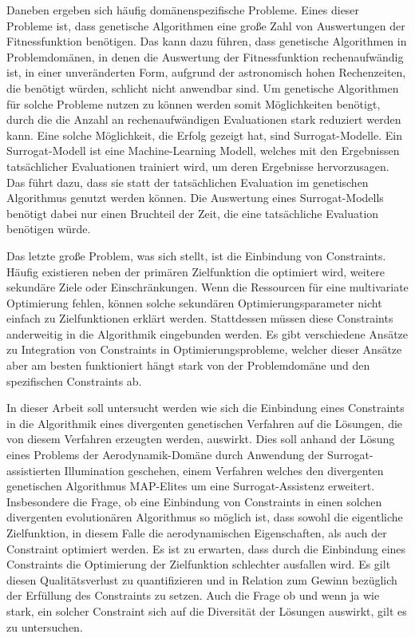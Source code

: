 Daneben ergeben sich häufig domänenspezifische Probleme.
Eines dieser Probleme ist, dass genetische Algorithmen eine große Zahl von Auswertungen der Fitnessfunktion benötigen.
Das kann dazu führen, dass genetische Algorithmen in Problemdomänen, in denen die Auswertung der Fitnessfunktion rechenaufwändig ist, in einer unveränderten Form,
aufgrund der astronomisch hohen Rechenzeiten, die benötigt würden, schlicht nicht anwendbar sind.
Um genetische Algorithmen für solche Probleme nutzen zu können werden somit Möglichkeiten benötigt, durch die die Anzahl an rechenaufwändigen Evaluationen stark reduziert werden kann.
Eine solche Möglichkeit, die Erfolg gezeigt hat, sind Surrogat-Modelle.
Ein Surrogat-Modell ist eine Machine-Learning Modell, welches mit den Ergebnissen tatsächlicher Evaluationen trainiert wird, um deren Ergebnisse hervorzusagen.
Das führt dazu, dass sie statt der tatsächlichen Evaluation im genetischen Algorithmus genutzt werden können.
Die Auswertung eines Surrogat-Modells benötigt dabei nur einen Bruchteil der Zeit, die eine tatsächliche Evaluation benötigen würde.

Das letzte große Problem, was sich stellt, ist die Einbindung von Constraints.
Häufig existieren neben der primären Zielfunktion die optimiert wird, weitere sekundäre Ziele oder Einschränkungen.
Wenn die Ressourcen für eine multivariate Optimierung fehlen, können solche sekundären Optimierungsparameter nicht einfach zu Zielfunktionen erklärt werden.
Stattdessen müssen diese Constraints anderweitig in die Algorithmik eingebunden werden.
Es gibt verschiedene Ansätze zu Integration von Constraints in Optimierungsprobleme, welcher dieser Ansätze aber am besten funktioniert hängt stark von der Problemdomäne und den spezifischen Constraints ab.

In dieser Arbeit soll untersucht werden wie sich die Einbindung eines Constraints in die Algorithmik eines divergenten genetischen Verfahren auf die Lösungen, die von diesem Verfahren erzeugten werden, auswirkt.
Dies soll anhand der Lösung eines Problems der Aerodynamik-Domäne durch Anwendung der Surrogat-assistierten Illumination geschehen, einem Verfahren welches den divergenten genetischen Algorithmus MAP-Elites um eine Surrogat-Assistenz erweitert.
Insbesondere die Frage, ob eine Einbindung von Constraints in einen solchen divergenten evolutionären Algorithmus so möglich ist, dass sowohl die eigentliche Zielfunktion, in diesem Falle die aerodynamischen Eigenschaften, als auch der Constraint optimiert werden.
Es ist zu erwarten, dass durch die Einbindung eines Constraints die Optimierung der Zielfunktion schlechter ausfallen wird.
Es gilt diesen Qualitätsverlust zu quantifizieren und in Relation zum Gewinn bezüglich der Erfüllung des Constraints zu setzen.
Auch die Frage ob und wenn ja wie stark, ein solcher Constraint sich auf die Diversität der Lösungen auswirkt, gilt es zu untersuchen.

